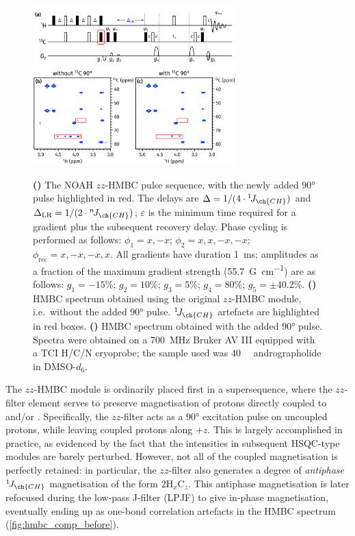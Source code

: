 \documentclass[a4paper,11pt]{article}
\newcommand{\carbon}{\ch{^{13}C}}
\newcommand{\nitrogen}{\ch{^{15}N}}
\newcommand{\onejch}{{}^1\!J_{\ch{CH}}}
\newcommand{\njch}{{}^n\!J_{\ch{CH}}}
\newcommand*{\andro}{Spectra were obtained on a \SI{700}{\MHz} Bruker AV III equipped with a TCI H/C/N cryoprobe; the sample used was \SI{40}{\milli\molar} andrographolide in DMSO-\(d_6\).}
\begin{document}
\begin{refsection}
\begin{figure}[ht]
    \centering
    \includegraphics[width=0.7\textwidth]{hmbc_comp.png}
    {\label{fig:hmbc_comp_pulprog}}
    {\label{fig:hmbc_comp_before}}
    {\label{fig:hmbc_comp_after}}
    \caption{
        \textbf{()} The NOAH \(zz\)-HMBC pulse sequence, with the newly added \carbon{} \ang{90} pulse highlighted in red.
        The delays are \(\Delta = 1/(4 \cdot \onejch)\) and \(\Delta_{\text{LR}} = 1/(2 \cdot \njch)\); \(\varepsilon\) is the minimum time required for a gradient plus the subsequent recovery delay.
        Phase cycling is performed as follows: \(\phi_1 = x, -x\); \(\phi_2 = x, x, -x, -x\); \(\phi_{\text{rec}} = x, -x, -x, x\).
        All gradients have duration \SI{1}{ms}; amplitudes as a fraction of the maximum gradient strength (\SI{55.7}{G\per\cm}) are as follows: \(g_1 = -15\%\); \(g_2 = 10\%\); \(g_3 = 5\%\); \(g_4 = 80\%\); \(g_5 = \pm 40.2\%\).
        \textbf{()} HMBC spectrum obtained using the original \(zz\)-HMBC module, i.e.\ without the added \ang{90} pulse.
        \(\onejch{}\) artefacts are highlighted in red boxes.
        \textbf{()} HMBC spectrum obtained with the added \ang{90} pulse.
        \andro{}
    }
    \label{fig:hmbc_comp}
\end{figure}

The \(zz\)-HMBC module is ordinarily placed first in a supersequence, where the \(zz\)-filter element serves to preserve magnetisation of protons directly coupled to \carbon{} and/or \nitrogen{}.\autocite{Kupce2018CC,Kupce2019JMR}
Specifically, the \(zz\)-filter acts as a \ang{90} excitation pulse on uncoupled protons, while leaving coupled protons along \(+z\).
This is largely accomplished in practice, as evidenced by the fact that the intensities in subsequent HSQC-type modules are barely perturbed.
However, not all of the coupled magnetisation is perfectly retained: in particular, the \(zz\)-filter also generates a degree of \textit{antiphase} \(\onejch{}\) magnetisation of the form \(2\mathrm{H}_x\mathrm{C}_z\).
This antiphase magnetisation is later refocused during the low-pass J-filter (LPJF) to give in-phase magnetisation, eventually ending up as one-bond correlation artefacts in the HMBC spectrum (\cref{fig:hmbc_comp_before}).


\end{refsection}
\end{document}
